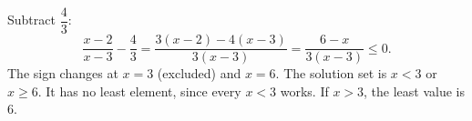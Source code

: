 Subtract $\dfrac43$:
\[\dfrac{x-2}{x-3}-\dfrac43=\dfrac{3(x-2)-4(x-3)}{3(x-3)}=\dfrac{6-x}{3(x-3)}\le0.\]
The sign changes at $x=3$ (excluded) and $x=6$. The solution set is $x<3$ or $x\ge6$. It has no least element, since every $x<3$ works. If $x>3$, the least value is $\boxed{6}$.

